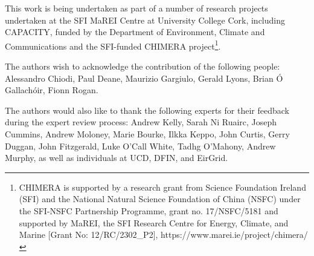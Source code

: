 \documentclass[gmd,manuscript]{copernicus}
\begin{document}


\begin{acknowledgements}
This work is being undertaken as part of a number of research projects undertaken at the SFI MaREI Centre at University College Cork, including CAPACITY, funded by the Department of Environment, Climate and Communications and the SFI-funded CHIMERA project\footnote{CHIMERA is supported by a research grant from Science Foundation Ireland (SFI) and the National Natural Science Foundation of China (NSFC) under the SFI-NSFC Partnership Programme, grant no. 17/NSFC/5181 and supported by MaREI, the SFI Research Centre for Energy, Climate, and Marine [Grant No: 12/RC/2302\_P2], https://www.marei.ie/project/chimera/}.

The authors wish to acknowledge the contribution of the following people: Alessandro Chiodi, Paul Deane, Maurizio Gargiulo, Gerald Lyons, Brian \'{O} Gallach\'{o}ir, Fionn Rogan.

The authors would also like to thank the following experts for their feedback during the expert review process: Andrew Kelly, Sarah Ni Ruairc, Joseph Cummins, Andrew Moloney, Marie Bourke, Ilkka Keppo, John Curtis, Gerry Duggan, John Fitzgerald, Luke O'Call White, Tadhg O'Mahony, Andrew Murphy, as well as individuals at UCD, DFIN, and EirGrid.
\end{acknowledgements}










\end{document}
